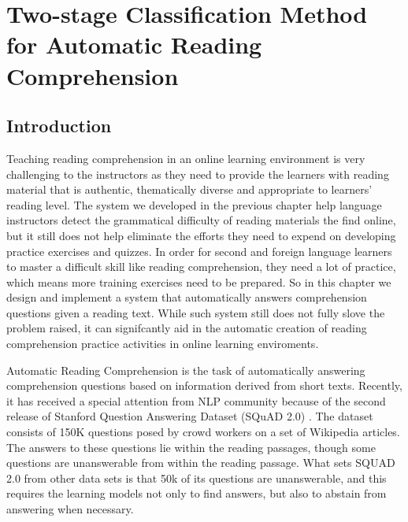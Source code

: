 
\chapter{Two-stage Classification Method for Automatic Reading Comprehension } %

\label{Chapter3} %

\section{Introduction}

Teaching reading comprehension in an online learning environment is very challenging to the instructors as they need to provide the learners with reading material that is authentic, thematically diverse and appropriate to learners' reading level. The system we developed in the previous chapter help language instructors detect the grammatical difficulty of reading materials the find online, but it still does not help eliminate the efforts they need to expend on developing practice exercises and quizzes. In order for second and foreign language learners to master a difficult skill like reading comprehension, they need a lot of practice, which means more training exercises need to be prepared. So in this chapter we design and implement a system that automatically answers comprehension questions given a reading text. While such system still does not fully slove the problem raised, it can signifcantly aid in the automatic creation of reading comprehension practice activities in online learning enviroments. 

Automatic Reading Comprehension is the task of automatically answering comprehension questions based on information derived from short texts. Recently, it has received a special attention from NLP community because of the second release of Stanford Question Answering Dataset (SQuAD 2.0) \citep{rajpurkar2018know}. The dataset consists of 150K questions posed by crowd workers on a set of Wikipedia articles. The answers to these questions lie within the reading passages, though some questions are unanswerable from within the reading passage. What sets SQUAD 2.0 from other data sets is that 50k of its questions are unanswerable, and this requires the learning models not only to find answers, but also to abstain from answering when necessary. \\

